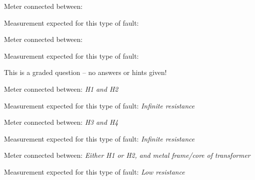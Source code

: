 \vskip 5pt
\item{} Meter connected between:
\vskip 5pt
\item{} Measurement expected for this type of fault:

\vskip 30pt

\noindent
{}

\vskip 5pt
\item{} Meter connected between:
\vskip 5pt
\item{} Measurement expected for this type of fault:

\vfil 

\eject






This is a graded question -- no answers or hints given!







\noindent
{}

\vskip 5pt
\item{} Meter connected between: {\it H1 and H2}
\vskip 5pt
\item{} Measurement expected for this type of fault: {\it Infinite resistance}

\vskip 30pt

\noindent
{}

\vskip 5pt
\item{} Meter connected between: {\it H3 and H4}
\vskip 5pt
\item{} Measurement expected for this type of fault: {\it Infinite resistance}

\vskip 30pt

\noindent
{}

\vskip 5pt
\item{} Meter connected between: {\it Either H1 or H2, and metal frame/core of transformer}
\vskip 5pt
\item{} Measurement expected for this type of fault: {\it Low resistance}

\vskip 30pt

\noindent
{}

